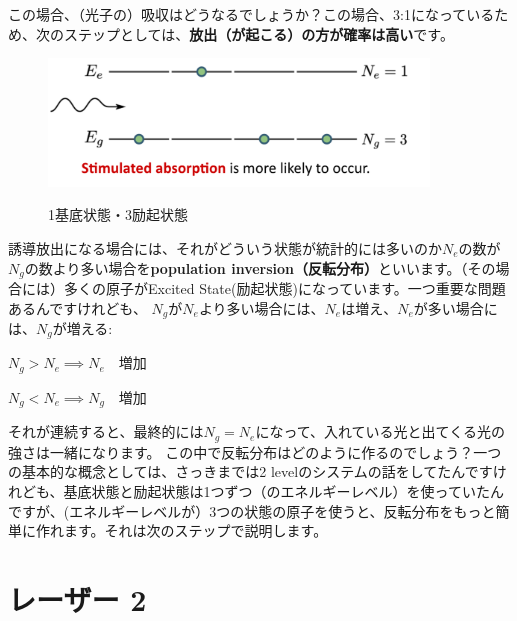 この場合、（光子の）吸収はどうなるでしょうか？この場合、3:1になっているため、次のステップとしては、\textbf{放出（が起こる）の方が確率は高い}です。
\begin{figure}[H]
    \centering
    \includegraphics[width=0.9\textwidth]{lesson5/3_ground_1_excited.pdf}
    \label{図: 1}
    \caption{1基底状態・3励起状態}
\end{figure}
誘導放出になる場合には、それがどういう状態が統計的には多いのか$N_e$の数が$N_g$の数より多い場合を\textbf{population inversion（反転分布）}といいます。（その場合には）多くの原子がExcited State(励起状態)になっています。一つ重要な問題あるんですけれども、
$N_g$が$N_e$より多い場合には、$N_e$は増え、$N_e$が多い場合には、$N_g$が増える:

$N_{g}>N_{e} \implies N_{e}$　増加

$N_{g}<N_{e} \implies N_{g}$　増加 

それが連続すると、最終的には\textbf{$N_g=N_e$}になって、入れている光と出てくる光の強さは一緒になります。
この中で反転分布はどのように作るのでしょう？一つの基本的な概念としては、さっきまでは2 levelのシステムの話をしてたんですけれども、基底状態と励起状態は1つずつ（のエネルギーレベル）を使っていたんですが、(エネルギーレベルが）3つの状態の原子を使うと、反転分布をもっと簡単に作れます。それは次のステップで説明します。


\section{レーザー 2}
